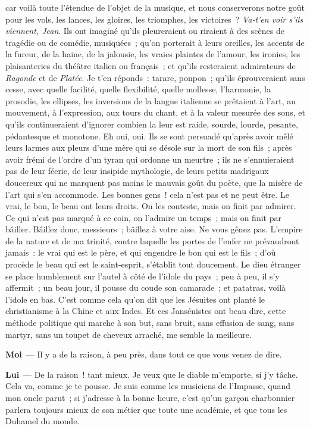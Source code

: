 \documentclass[french,twoside]{book} %
\newcommand{\labelchar}[1]{\textbf{\color{rubric} #1}}
\begin{document}
car voilà toute l’étendue de l’objet de la musique, et nous conserverons notre goût pour les vols, les lances, les gloires, les triomphes, les victoires ? \emph{Va-t’en voir s’ils viennent, Jean}. Ils ont imaginé qu’ils pleureraient ou riraient à des scènes de tragédie ou de comédie, musiquées ; qu’on porterait à leurs oreilles, les accents de la fureur, de la haine, de la jalousie, les vraies plaintes de l’amour, les ironies, les plaisanteries du théâtre italien ou français ; et qu’ils resteraient admirateurs de \emph{Ragonde} et de \emph{Platée}. Je t’en réponds : tarare, ponpon ; qu’ils éprouveraient sans cesse, avec quelle facilité, quelle flexibilité, quelle mollesse, l’harmonie, la prosodie, les ellipses, les inversions de la langue italienne se prêtaient à l’art, au mouvement, à l’expression, aux tours du chant, et à la valeur mesurée des sons, et qu’ils continueraient d’ignorer combien la leur est raide, sourde, lourde, pesante, pédantesque et monotone. Eh oui, oui. Ils se sont persuadé qu’après avoir mêlé leurs larmes aux pleurs d’une mère qui se désole sur la mort de son fils ; après avoir frémi de l’ordre d’un tyran qui ordonne un meurtre ; ils ne s’ennuieraient pas de leur féerie, de leur insipide mythologie, de leurs petits madrigaux doucereux qui ne marquent pas moins le mauvais goût du poète, que la misère de l’art qui s’en accommode. Les bonnes gens ! cela n’est pas et ne peut être. Le vrai, le bon, le beau ont leurs droits. On les conteste, mais on finit par admirer. Ce qui n’est pas marqué à ce coin, on l’admire un temps ; mais on finit par bâiller. Bâillez donc, messieurs ; bâillez à votre aise. Ne vous gênez pas. L’empire de la nature et de ma trinité, contre laquelle les portes de l’enfer ne prévaudront jamais : le vrai qui est le père, et qui engendre le bon qui est le fils ; d’où procède le beau qui est le saint-esprit, s’établit tout doucement. Le dieu étranger se place humblement sur l’autel à côté de l’idole du pays ; peu à peu, il s’y affermit ; un beau jour, il pousse du coude son camarade ; et patatras, voilà l’idole en bas. C’est comme cela qu’on dit que les Jésuites ont planté le christianisme à la Chine et aux Indes. Et ces Jansénistes ont beau dire, cette méthode politique qui marche à son but, sans bruit, sans effusion de sang, sans martyr, sans un toupet de cheveux arraché, me semble la meilleure.\par
\labelchar{Moi} — Il y a de la raison, à peu près, dans tout ce que vous venez de dire.\par
\labelchar{Lui} — De la raison ! tant mieux. Je veux que le diable m’emporte, si j’y tâche. Cela va, comme je te pousse. Je suis comme les musiciens de l’Impasse, quand mon oncle parut ; si j’adresse à la bonne heure, c’est qu’un garçon charbonnier parlera toujours mieux de son métier que toute une académie, et que tous les Duhamel du monde.\par
\end{document}
